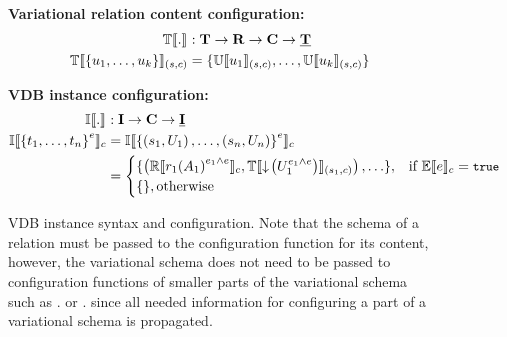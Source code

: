 \begin{figure}
\textbf{Variational relation content configuration:}
%
\begin{alignat*}{1}%
\otSemType [] . &: \vRelContSet \to \vRelSchSet \to \confSet \to \pRelContSet\\
%
\otSem {\vRelSch} {\setDef {\vi \tuple \numTuples}} &= \setDef {\ouSem {\vRelSch}{\tuple_1}, \hdots, \ouSem{\vRelSch} {\tuple_\numTuples}}
\end{alignat*}

\textbf{VDB instance configuration:}
%
\begin{alignat*}{1}%
\odbSem [] . &: \vInstSet \to \confSet \to \pInstSet\\
%
\odbSem { \annot  {\setDef {\vi \vTab \numRels}}} 
&=\odbSem { \annot  { \setDef {\left( \vRelSch_1, \vRelCont_1\right), \ldots, 
\left( \vRelSch_\numRels, \vRelCont_\numRels\right)}}}\\
& = \begin{cases}
\setDef{\left( \orSem {\vRel_1 \annot [\dimMeta_1 {\wedge \dimMeta}] {\left( \vAttList_1 \right)} }, 
\otSem {\vRelSch_1} {\pushIn {\annot [\dimMeta_1 {\wedge \dimMeta}] \vRelCont_1}} \right), \ldots}, &\If \fSem \dimMeta = \t \\
\setDef {}, \Otherwise
\end{cases}
\end{alignat*}

\caption{VDB instance syntax and configuration.
Note that the schema of a relation must be passed to the configuration function
for its content,
however, the variational schema does not need to be passed to configuration 
functions of smaller parts of the variational schema such as \orSem .  or \olSem .
since all needed information for configuring a part of a variational schema
is propagated.
}
\label{fig:vdb-conf}
\end{figure} 

